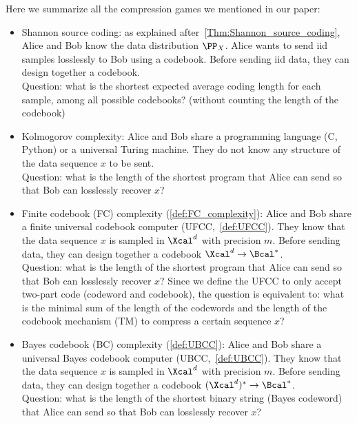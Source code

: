 Here we summarize all the compression games we mentioned in our paper:
\begin{itemize}
    \item Shannon source coding: as explained after~\cref{Thm:Shannon_source_coding}, Alice and Bob know the data distribution $\PP_X$. Alice wants to send iid samples losslessly to Bob using a codebook. Before sending iid data, they can design together a codebook.\\ Question: what is the shortest expected average coding length for each sample, among all possible codebooks? (without counting the length of the codebook)
    \item Kolmogorov complexity: Alice and Bob share a programming language (C, Python) or a universal Turing machine. They do not know any structure of the data sequence $x$ to be sent.\\ Question: what is the length of the shortest program that Alice can send so that Bob can losslessly recover $x$?
    \item Finite codebook (FC) complexity (\cref{def:FC_complexity}): Alice and Bob share a finite universal codebook computer (UFCC,~\cref{def:UFCC}). They know that the data sequence $x$ is sampled in $\Xcal^d$ with precision $m$. Before sending data, they can design together a codebook $\Xcal^d \to \Bcal^*$.\\ Question: what is the length of the shortest program that Alice can send so that Bob can losslessly recover $x$? Since we define the UFCC to only accept two-part code (codeword and codebook), the question is equivalent to: what is the minimal sum of the length of the codewords and the length of the codebook mechanism (TM) to compress a certain sequence $x$?
    \item Bayes codebook (BC) complexity (\cref{def:UBCC}): Alice and Bob share a universal Bayes codebook computer (UBCC,~\cref{def:UBCC}). They know that the data sequence $x$ is sampled in $\Xcal^d$ with precision $m$. Before sending data, they can design together a codebook $(\Xcal^d)^* \to \Bcal^*$.\\ Question: what is the length of the shortest binary string (Bayes codeword) that Alice can send so that Bob can losslessly recover $x$?
\end{itemize}
%